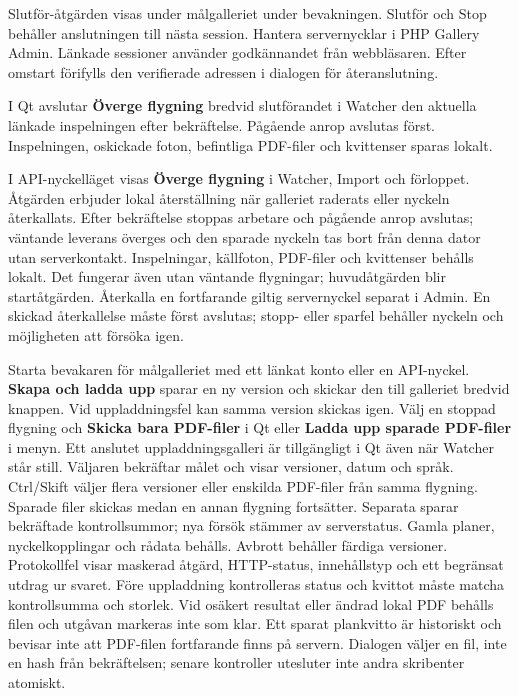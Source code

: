 \documentclass[11pt,a4paper]{article}
\newcommand{\filepath}[1]{\path{#1}}
\newcommand{\ui}[1]{\textbf{#1}}
\begin{document}
Slutför-åtgärden visas under målgalleriet under bevakningen. Slutför och Stop
behåller anslutningen till nästa session. Hantera servernycklar i PHP Gallery
Admin. Länkade sessioner använder godkännandet från webbläsaren. Efter
omstart förifylls den verifierade adressen i dialogen för återanslutning.

I Qt avslutar \ui{Överge flygning} bredvid slutförandet i Watcher den aktuella
länkade inspelningen efter bekräftelse. Pågående anrop avslutas först.
Inspelningen, oskickade foton, befintliga PDF-filer och kvittenser sparas lokalt.

I API-nyckelläget visas \ui{Överge flygning} i Watcher, Import och förloppet.
Åtgärden
erbjuder lokal återställning när galleriet raderats eller nyckeln återkallats.
Efter bekräftelse stoppas arbetare och pågående anrop avslutas; väntande
leverans överges och den sparade nyckeln tas bort från denna dator utan
serverkontakt. Inspelningar, källfoton, PDF-filer och kvittenser behålls lokalt.
Det fungerar även utan väntande flygningar; huvudåtgärden blir
startåtgärden. Återkalla en fortfarande giltig servernyckel separat
i Admin. En skickad återkallelse måste först avslutas; stopp- eller sparfel
behåller nyckeln och möjligheten att försöka igen.

Starta bevakaren för målgalleriet med ett länkat konto eller en API-nyckel.
\ui{Skapa och ladda upp} sparar en ny version och skickar den till galleriet
bredvid knappen. Vid uppladdningsfel kan samma version skickas igen.
Välj en stoppad flygning och \ui{Skicka bara PDF-filer} i Qt eller
\ui{Ladda upp sparade PDF-filer} i menyn. Ett anslutet uppladdningsgalleri
är tillgängligt i Qt även när Watcher står still. Väljaren bekräftar målet
och visar versioner, datum och språk. Ctrl/Skift väljer flera versioner
eller enskilda PDF-filer från samma flygning. Sparade filer skickas medan
en annan flygning fortsätter. Separata
\filepath{upload-receipts.json} sparar bekräftade kontrollsummor; nya försök
stämmer av serverstatus. Gamla planer, nyckelkopplingar och rådata behålls.
Avbrott behåller färdiga versioner. Protokollfel visar maskerad åtgärd,
HTTP-status, innehållstyp och ett begränsat utdrag ur svaret.
Före uppladdning kontrolleras status och kvittot måste matcha kontrollsumma och
storlek. Vid osäkert resultat eller ändrad lokal PDF behålls filen och utgåvan
markeras inte som klar. Ett sparat plankvitto är historiskt och bevisar inte att
PDF-filen fortfarande finns på servern.
Dialogen väljer en fil, inte en hash från bekräftelsen; senare kontroller
utesluter inte andra skribenter atomiskt.
\end{document}

